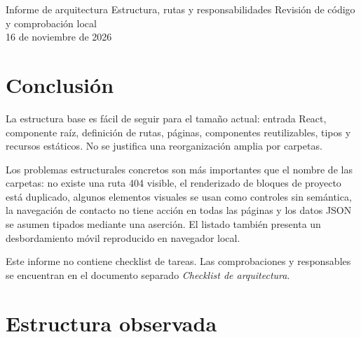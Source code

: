 \documentclass[11pt,a4paper]{report}
\begin{document}
\entregableportada
  {Informe de arquitectura}
  {Estructura, rutas y responsabilidades}
  {Revisión de código y comprobación local\\16 de noviembre de 2026}

\tableofcontents
\clearpage

\chapter{Conclusión}

La estructura base es fácil de seguir para el tamaño actual: entrada React, componente raíz, definición de rutas, páginas, componentes reutilizables, tipos y recursos estáticos. No se justifica una reorganización amplia por carpetas.

Los problemas estructurales concretos son más importantes que el nombre de las carpetas: no existe una ruta 404 visible, el renderizado de bloques de proyecto está duplicado, algunos elementos visuales se usan como controles sin semántica, la navegación de contacto no tiene acción en todas las páginas y los datos JSON se asumen tipados mediante una aserción. El listado también presenta un desbordamiento móvil reproducido en navegador local.

Este informe no contiene checklist de tareas. Las comprobaciones y responsables se encuentran en el documento separado \textit{Checklist de arquitectura}.

\chapter{Estructura observada}
\end{document}
